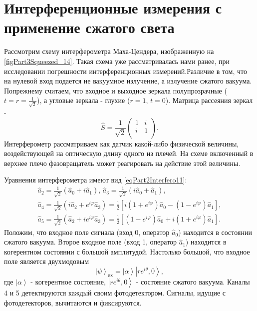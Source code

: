 \section{Интерференционные измерения с применение сжатого света}
Рассмотрим схему интерферометра Маха-Цендера, изображенную на
\autoref{figPart3Squeezed_14}.
Такая схема уже рассматривалась нами ранее, при исследовании
погрешности интерференционных измерений.Различие в том, что на нулевой
вход подается не вакуумное излучение, а излучение сжатого вакуума.
Попрежнему считаем, что входное и выходное зеркала полупрозрачные ($t
=r =\frac{1}{\sqrt{2}}$), а угловые зеркала - глухие ($r = 1$, $t =
0$). Матрица рассеяния зеркал - 
\begin{equation}
\hat{S} = \frac{1}{\sqrt{2}}\left(
\begin{array}{cc}
1 & i \\
i & 1 \\
\end{array}
\right).
\nonumber
\end{equation}
Интерферометр рассматриваем как датчик какой-либо физической величины,
воздействующей на оптическую длину одного из плечей. На схеме
включенный в верхнее плечо фазовращатель может реагировать на
действие этой величины.



Уравнения интерферометра имеют вид \eqref{eqPart2Interfero11}:
\begin{eqnarray}
\hat{a}_2 = \frac{1}{\sqrt{2}} \left(\hat{a}_0 + i \hat{a}_1\right),
\,
\hat{a}_3 = \frac{1}{\sqrt{2}} \left(i \hat{a}_0 + \hat{a}_1\right),
\nonumber \\
\hat{a}_4 = \frac{1}{\sqrt{2}} \left(i \hat{a}_2 + e^{i \varphi}
\hat{a}_3\right) = 
\frac{1}{2}\left[
i \left(1 + e^{i \varphi}\right)\hat{a}_0 -
\left(1 - e^{i \varphi}\right)\hat{a}_1
\right],
\nonumber \\
\hat{a}_5 = \frac{1}{\sqrt{2}} \left(\hat{a}_2 + i e^{i \varphi}
\hat{a}_3\right) = 
\frac{1}{2}\left[
\left(1 - e^{i \varphi}\right)\hat{a}_0 +
i \left(1 + e^{i \varphi}\right)\hat{a}_1
\right].
\label{eqPart3SqueezedAddAddAdd2}
\end{eqnarray}
Положим, что входное поле сигнала (вход 0, оператор $\hat{a}_0$)
находится в состоянии сжатого вакуума. Второе входное поле 
(вход 1, оператор $\hat{a}_1$) находится в когерентном состоянии с
большой амплитудой. Настолько большой, что входное поле является
двухмодовым 
\[
\left|\psi\right>_{\mbox{вх}} =
\left|\alpha\right>
\left|re^{i \theta}, 0\right>,
\]
где $\left|\alpha\right>$ - когерентное состояние,
$\left|re^{i \theta}, 0\right>$ - состояние сжатого вакуума. Каналы 4
и 5 детектируются каждый своим фотодетектором. Сигналы, идущие с
фотодетекторов, вычитаются и фиксируются.

